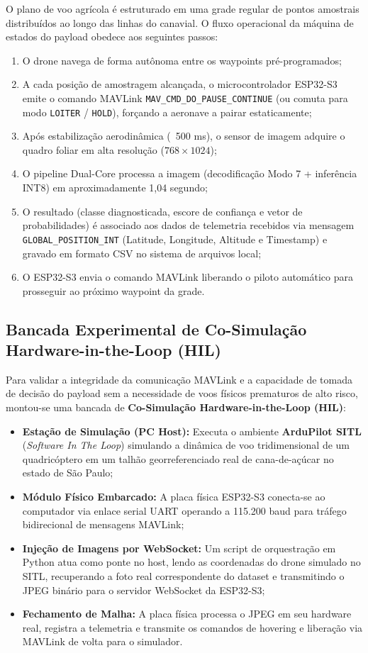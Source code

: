 O plano de voo agrícola é estruturado em uma grade regular de pontos amostrais distribuídos ao longo das linhas do canavial. O fluxo operacional da máquina de estados do payload obedece aos seguintes passos:
\begin{enumerate}
    \item O drone navega de forma autônoma entre os waypoints pré-programados;
    \item A cada posição de amostragem alcançada, o microcontrolador ESP32-S3 emite o comando MAVLink \texttt{MAV\_CMD\_DO\_PAUSE\_CONTINUE} (ou comuta para modo \texttt{LOITER} / \texttt{HOLD}), forçando a aeronave a pairar estaticamente;
    \item Após estabilização aerodinâmica (~500 ms), o sensor de imagem adquire o quadro foliar em alta resolução ($768 \times 1024$);
    \item O pipeline Dual-Core processa a imagem (decodificação Modo 7 + inferência INT8) em aproximadamente 1,04 segundo;
    \item O resultado (classe diagnosticada, escore de confiança e vetor de probabilidades) é associado aos dados de telemetria recebidos via mensagem \texttt{GLOBAL\_POSITION\_INT} (Latitude, Longitude, Altitude e Timestamp) e gravado em formato CSV no sistema de arquivos local;
    \item O ESP32-S3 envia o comando MAVLink liberando o piloto automático para prosseguir ao próximo waypoint da grade.
\end{enumerate}

\subsection{Bancada Experimental de Co-Simulação Hardware-in-the-Loop (HIL)}

Para validar a integridade da comunicação MAVLink e a capacidade de tomada de decisão do payload sem a necessidade de voos físicos prematuros de alto risco, montou-se uma bancada de \textbf{Co-Simulação Hardware-in-the-Loop (HIL)}:
\begin{itemize}
    \item \textbf{Estação de Simulação (PC Host):} Executa o ambiente \textbf{ArduPilot SITL} (\textit{Software In The Loop}) simulando a dinâmica de voo tridimensional de um quadricóptero em um talhão georreferenciado real de cana-de-açúcar no estado de São Paulo;
    \item \textbf{Módulo Físico Embarcado:} A placa física ESP32-S3 conecta-se ao computador via enlace serial UART operando a 115.200 baud para tráfego bidirecional de mensagens MAVLink;
    \item \textbf{Injeção de Imagens por WebSocket:} Um script de orquestração em Python atua como ponte no host, lendo as coordenadas do drone simulado no SITL, recuperando a foto real correspondente do dataset e transmitindo o JPEG binário para o servidor WebSocket da ESP32-S3;
    \item \textbf{Fechamento de Malha:} A placa física processa o JPEG em seu hardware real, registra a telemetria e transmite os comandos de hovering e liberação via MAVLink de volta para o simulador.
\end{itemize}

